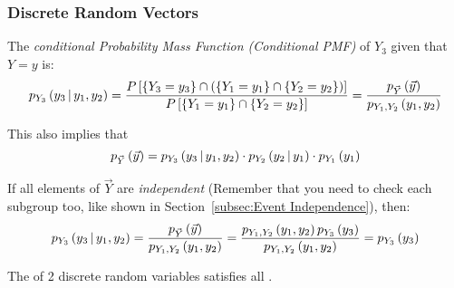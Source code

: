 		\subsubsection{Discrete Random Vectors} \label{subsubsec:Conditional Probability Discrete Random Vectors}
			\begin{definition} \label{def:Discrete Random Vector-Conditional PMF}
				The \emph{conditional Probability Mass Function (Conditional PMF)} of $Y_{3}$ given that $Y=y$ is:
				\begin{equation} \label{eq:Discrete Random Vector-Conditional PMF}
					p_{Y_{3}} \left( y_{3} \operatorname{\vert} y_{1},y_{2} \right)
					= \frac{P \left[ \lbrace Y_{3}=y_{3} \rbrace \cap \left( \lbrace Y_{1}=y_{1} \rbrace \cap \lbrace Y_{2}=y_{2} \rbrace \right) \right]}{P \left[ \lbrace Y_{1}=y_{1} \rbrace \cap \lbrace Y_{2}=y_{2} \rbrace \right]} 
					= \frac{p_{\vec{Y}} \left( \vec{y} \right)}{p_{Y_{1},Y_{2}} \left( y_{1},y_{2} \right)}
				\end{equation}
				\begin{remark}
					This also implies that
					\begin{equation} \label{eq:Discrete Random Vector-Joint PMF}
						p_{\vec{Y}} \left( \vec{y} \right) = p_{Y_{3}} \left( y_{3} \operatorname{\vert} y_{1},y_{2} \right) \cdot p_{Y_{2}} \left( y_{2} \operatorname{\vert} y_{1} \right) \cdot p_{Y_{1}} \left( y_{1} \right)
					\end{equation}
				\end{remark}
				\begin{remark}
					If all elements of $\vec{Y}$ are \emph{independent} (Remember that you need to check each subgroup too, like shown in Section~\ref{subsec:Event Independence}), then:
					\begin{equation} \label{eq:Discrete Random Vector-Independent Conditional PMF}
						p_{Y_{3}} \left( y_{3} \operatorname{\vert} y_{1},y_{2} \right)
						= \frac{p_{\vec{Y}} \left( \vec{y} \right)}{p_{Y_{1},Y_{2}} \left( y_{1},y_{2} \right)}
						= \frac{p_{Y_{1},Y_{2}} \left( y_{1},y_{2} \right) p_{Y_{3}} \left( y_{3} \right)}{p_{Y_{1},Y_{2}} \left( y_{1},y_{2} \right)}
						= p_{Y_{3}} \left( y_{3} \right)
					\end{equation}
				\end{remark}
				\begin{remark}
					The  of 2 discrete random variables satisfies all .
				\end{remark}
			\end{definition}
		

